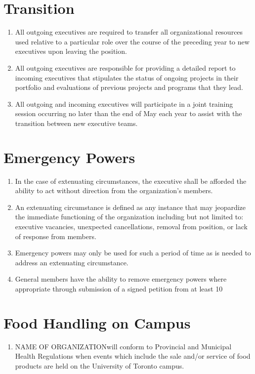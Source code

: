 \documentclass[12pt]{article}
\newcommand{\orgname}{NAME OF ORGANIZATION\space}
\begin{document}
\section{Transition}
\begin{enumerate}[{12}.1]
    \item	All outgoing executives are required to transfer all organizational resources used relative to a particular role over the course of the preceding year to new executives upon leaving the position. 
    \item	All outgoing executives are responsible for providing a detailed report to incoming executives that stipulates the status of ongoing projects in their portfolio and evaluations of previous projects and programs that they lead.
    \item	All outgoing and incoming executives will participate in a joint training session occurring no later than the end of May each year to assist with the transition between new executive teams.
\end{enumerate}


\section{Emergency Powers}
\begin{enumerate}[{13}.1]
    \item	In the case of extenuating circumstances, the executive shall be afforded the ability to act without direction from the organization’s members. 
    \item	An extenuating circumstance is defined as any instance that may jeopardize the immediate functioning of the organization including but not limited to: executive vacancies, unexpected cancellations, removal from position, or lack of response from members.
    \item	Emergency powers may only be used for such a period of time as is needed to address an extenuating circumstance. 
    \item	General members have the ability to remove emergency powers where appropriate through submission of a signed petition from at least 10%
\end{enumerate}


\section{Food Handling on Campus}
\begin{enumerate}[{14}.1]
    \item \orgname will conform to Provincial and Municipal Health Regulations when events which include the sale and/or service of food products are held on the University of Toronto campus.
\end{enumerate}
\end{document}
